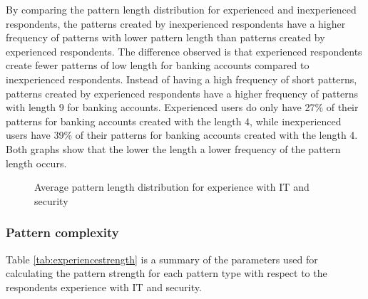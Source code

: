     By comparing the pattern length distribution for experienced and inexperienced respondents, the patterns created by inexperienced respondents have a higher frequency of patterns with lower pattern length than patterns created by experienced respondents. The difference observed is that experienced respondents create fewer patterns of low length for banking accounts compared to inexperienced respondents. Instead of having a high frequency of short patterns, patterns created by experienced respondents have a higher frequency of patterns with length 9 for banking accounts. Experienced users do only have 27\% of their patterns for banking accounts created with the length 4, while inexperienced users have 39\% of their patterns for banking accounts created with the length 4. Both graphs show that the lower the length a lower frequency of the pattern length occurs.

      \begin{figure}[H]
        \centering
        \caption{Average pattern length distribution for experience with IT and security}
        \label{fig:avgpatterndistexperience}
      \end{figure}

    \clearpage
    \subsubsection{Pattern complexity}
    Table \ref{tab:experiencestrength} is a summary of the parameters used for calculating the pattern strength for each pattern type with respect to the respondents experience with IT and security. 

